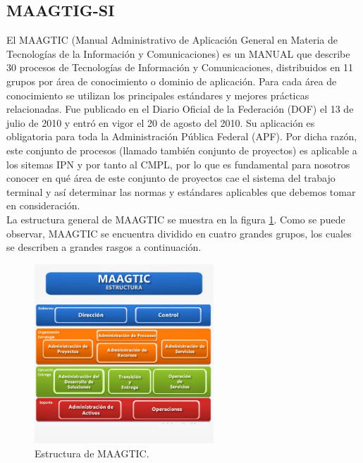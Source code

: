	\subsection{MAAGTIG-SI}%
	El MAAGTIC (Manual Administrativo de Aplicación General en Materia de Tecnologías de la Información y Comunicaciones) es un MANUAL que describe 30 procesos de Tecnologías de Información y Comunicaciones, distribuidos en 11 grupos por área de conocimiento o dominio de aplicación. Para cada área de conocimiento se utilizan los principales estándares y mejores prácticas relacionadas\cite{MAAGTICSI}. Fue publicado en el Diario Oficial de la Federación (DOF) el 13 de julio de 2010 y entró en vigor el 20 de agosto del 2010. Su aplicación es obligatoria para toda la Administración Pública Federal (APF). Por dicha razón, este conjunto de procesos (llamado también conjunto de proyectos) es aplicable a los sitemas IPN y por tanto al CMPL, por lo que es fundamental para nosotros conocer en qué área de este conjunto de proyectos cae el sistema del trabajo terminal y así determinar las normas y estándares aplicables que debemos tomar en consideración.\\
	
	La estructura general de MAAGTIC se muestra en la figura \ref{fig:MAAGTIC}. Como se puede observar, MAAGTIC se encuentra dividido en cuatro grandes grupos, los cuales se describen a grandes rasgos a continuación.\\
	
	\begin{figure}[htbp!]
		\centering
			\includegraphics[width=0.6\textwidth]{images/antecedentes/MAAGTICSI.jpg}
		\caption{Estructura de MAAGTIC\cite{MAAGTICSIEstructura}.}
		\label{fig:MAAGTIC}
	\end{figure}
	
